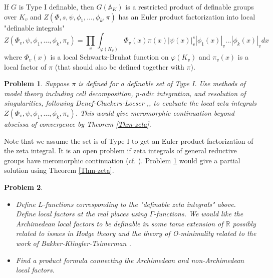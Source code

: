 \documentclass[12pt]{amsart}
\def\A{\mathbb{A}}
\def\R{\mathbb{R}}
\def\R{\mathbb{R}}
\numberwithin{equation}{section}
\newtheorem{prob}{Problem}[section]
\begin{document}
If $G$ is Type I definable, then $G(\A_K)$ is a restricted product of definable groups over $K_v$ and 
$Z(\Phi,s,\psi,\phi_1,\dots,\phi_k,\pi)$ has an Euler product factorization into local "definable integrals" 
$$Z(\Phi_v,\psi,\phi_1,\dots,\phi_k, \pi_v)=\prod_v \int_{\varphi(K_v)} \Phi_v(x)\pi(x)|\psi(x)|_v^s|\phi_1(x)|_v\dots |\phi_k(x)|_v dx$$ 
where $\Phi_v(x)$ is a local Schwartz-Bruhat function on $\varphi(K_v)$ 
and $\pi_v(x)$ is a local factor of $\pi$ (that should also be defined together with $\pi$). 

\begin{prob}\label{aut-eval} Suppose $\pi$ is defined for a definable set of Type I. Use methods of model theory including cell decomposition, p-adic integration, and resolution of singularities, following Denef-Cluckers-Loeser \cite{DL},\cite{CL1},\cite{CL2} to 
evaluate the local zeta integrals $Z(\Phi_v,\psi,\phi_1,\dots,\phi_k, \pi_v)$. This would give meromorphic continuation beyond abscissa of convergence 
by Theorem \ref{Thm-zeta}.\end{prob}
Note that we assume the set is of Type I to get an Euler product factorization of the zeta integral.
It is an open problem if zeta integrals of general reductive groups have meromorphic continuation (cf. \cite{lang-prob}). Problem \ref{aut-eval} would give a partial solution using Theorem \ref{Thm-zeta}.


\begin{prob}\label{zeta-arch}\noindent\begin{itemize} 
\item Define $L$-functions corresponding to the "definable zeta integrals" above. Define local factors at the real places using $\Gamma$-functions. We would like the Archimedean local factors to be definable in some tame extension of $\R$ possibly related to issues in Hodge theory and the theory of O-minimality related to the work of Bakker-Klingler-Tsimerman \cite{BKT}. 
\item Find a product formula connecting the Archimedean and non-Archimedean local factors.
\end{itemize}\end{prob}
\end{document}
